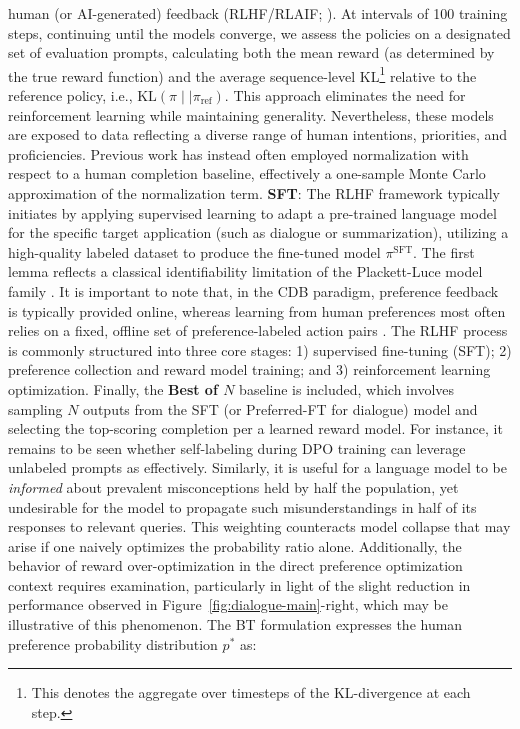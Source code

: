 human (or AI-generated) feedback (RLHF/RLAIF; \citep{christiano2017deep,bai2022constitutional}). At intervals of 100 training steps, continuing until the models converge, we assess the policies on a designated set of evaluation prompts, calculating both the mean reward (as determined by the true reward function) and the average sequence-level KL\footnote{This denotes the aggregate over timesteps of the KL-divergence at each step.} relative to the reference policy, i.e., $\text{KL}\left(\pi\mid \mid \pi_\text{ref}\right)$. This approach eliminates the need for reinforcement learning while maintaining generality. Nevertheless, these models are exposed to data reflecting a diverse range of human intentions, priorities, and proficiencies. Previous work has instead often employed normalization with respect to a human completion baseline, effectively a one-sample Monte Carlo approximation of the normalization term. \textbf{SFT}: The RLHF framework typically initiates by applying supervised learning to adapt a pre-trained language model for the specific target application (such as dialogue or summarization), utilizing a high-quality labeled dataset to produce the fine-tuned model $\pi^\text{SFT}$. The first lemma reflects a classical identifiability limitation of the Plackett-Luce model family \cite{plackett1975analysis}. It is important to note that, in the CDB paradigm, preference feedback is typically provided online, whereas learning from human preferences most often relies on a fixed, offline set of preference-labeled action pairs \citep{yan2022human}. The RLHF process is commonly structured into three core stages: 1) supervised fine-tuning (SFT); 2) preference collection and reward model training; and 3) reinforcement learning optimization. Finally, the \textbf{Best of $N$} baseline is included, which involves sampling $N$ outputs from the SFT (or Preferred-FT for dialogue) model and selecting the top-scoring completion per a learned reward model. For instance, it remains to be seen whether self-labeling during DPO training can leverage unlabeled prompts as effectively. Similarly, it is useful for a language model to be \textit{informed} about prevalent misconceptions held by half the population, yet undesirable for the model to propagate such misunderstandings in half of its responses to relevant queries. This weighting counteracts model collapse that may arise if one naively optimizes the probability ratio alone. Additionally, the behavior of reward over-optimization in the direct preference optimization context requires examination, particularly in light of the slight reduction in performance observed in Figure~\ref{fig:dialogue-main}-right, which may be illustrative of this phenomenon. The BT formulation expresses the human preference probability distribution $p^*$ as:

